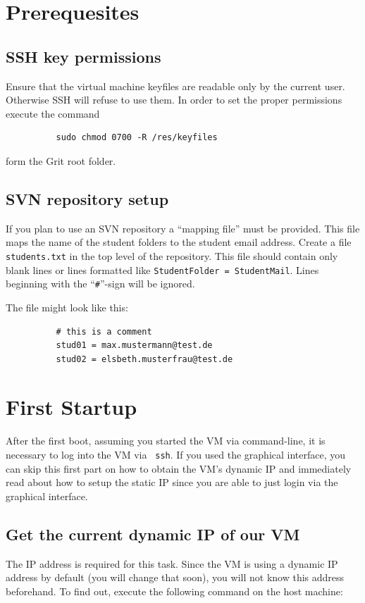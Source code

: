 \documentclass[10pt,a4paper, titlepage, toc=idx]{scrreprt}
\theoremstyle{definition}
\theoremstyle{plain}
\newcommand*{\product}{Grit}
\begin{document}
        \section{Prerequesites}
        \subsection{SSH key permissions}
        Ensure that the virtual machine keyfiles are readable only by
        the current user. Otherwise SSH will refuse to use them. In
        order to set the proper permissions execute the command
\begin{lstlisting}
          sudo chmod 0700 -R /res/keyfiles 
\end{lstlisting}
        form the \product{} root folder.

        \subsection{SVN repository setup}
        If you plan to use an SVN repository a ``mapping file'' must
        be provided. This file maps the name of the student folders to
        the student email address. Create a file \texttt{students.txt}
        in the top level of the repository. This file should contain
        only blank lines or lines formatted like \texttt{StudentFolder
          = StudentMail}. Lines beginning with the
        ``\texttt{\#}''-sign will be ignored.

        The file might look like this:
\begin{lstlisting}
          # this is a comment
          stud01 = max.mustermann@test.de
          stud02 = elsbeth.musterfrau@test.de
\end{lstlisting}

	\section{First Startup}
	After the first boot, assuming you started the VM via
        command-line, it is necessary to log into the VM via {\tt
          ssh}. If you used the graphical interface, you can skip this
        first part on how to obtain the VM's dynamic IP and
        immediately read about how to setup the static IP since you
        are able to just login via the graphical interface.

	\subsection{Get the current dynamic IP of our VM}
	The IP address is required for this task. Since the VM is
        using a dynamic IP address by default (you will change that
        soon), you will not know this address beforehand. To find out,
        execute the following command on the host machine:
	
\end{document}
